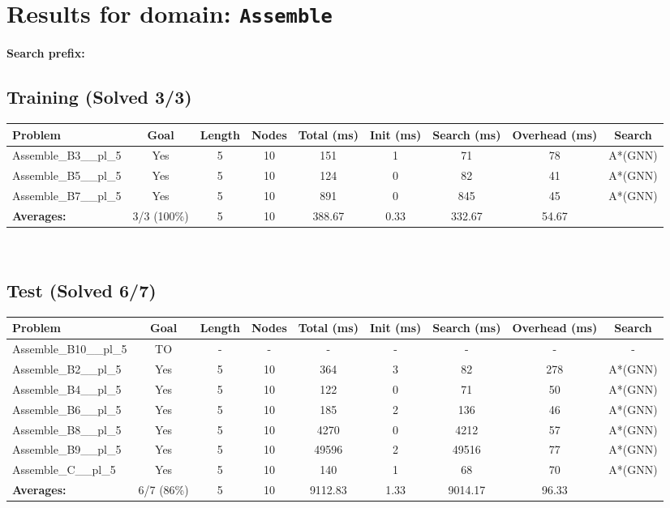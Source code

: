 \documentclass{article}
\begin{document}
\section*{Results for domain: \texttt{Assemble}}
\textbf{Search prefix:} 
\\[0.5cm]
\subsection*{Training (Solved 3/3)}
\begin{tabular}{lcccccccc}
\toprule
Problem & Goal & Length & Nodes & Total (ms) & Init (ms) & Search (ms) & Overhead (ms) & Search \\
\midrule
Assemble\_B3\_\_pl\_5 & Yes & 5 & 10 & 151 & 1 & 71 & 78 & A*(GNN) \\
Assemble\_B5\_\_pl\_5 & Yes & 5 & 10 & 124 & 0 & 82 & 41 & A*(GNN) \\
Assemble\_B7\_\_pl\_5 & Yes & 5 & 10 & 891 & 0 & 845 & 45 & A*(GNN) \\
\textbf{Averages:} & 3/3 (100\%) & 5 & 10 & 388.67 & 0.33 & 332.67 & 54.67 & \\
\bottomrule
\end{tabular}
\\[0.7cm]
\subsection*{Test (Solved 6/7)}
\begin{tabular}{lcccccccc}
\toprule
Problem & Goal & Length & Nodes & Total (ms) & Init (ms) & Search (ms) & Overhead (ms) & Search \\
\midrule
Assemble\_B10\_\_pl\_5 & TO & - & - & - & - & - & - & - \\
Assemble\_B2\_\_pl\_5 & Yes & 5 & 10 & 364 & 3 & 82 & 278 & A*(GNN) \\
Assemble\_B4\_\_pl\_5 & Yes & 5 & 10 & 122 & 0 & 71 & 50 & A*(GNN) \\
Assemble\_B6\_\_pl\_5 & Yes & 5 & 10 & 185 & 2 & 136 & 46 & A*(GNN) \\
Assemble\_B8\_\_pl\_5 & Yes & 5 & 10 & 4270 & 0 & 4212 & 57 & A*(GNN) \\
Assemble\_B9\_\_pl\_5 & Yes & 5 & 10 & 49596 & 2 & 49516 & 77 & A*(GNN) \\
Assemble\_C\_\_pl\_5 & Yes & 5 & 10 & 140 & 1 & 68 & 70 & A*(GNN) \\
\textbf{Averages:} & 6/7 (86\%) & 5 & 10 & 9112.83 & 1.33 & 9014.17 & 96.33 & \\
\bottomrule
\end{tabular}
\\[0.7cm]
\end{document}
